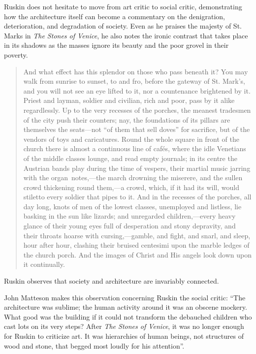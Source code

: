 Ruskin does not hesitate to move from art critic to social critic,
demonstrating how the architecture itself can become a commentary on
the denigration, deterioration, and degradation of society.  Even as he
praises the majesty of St. Mark{\textquotesingle}s in \textit{The
Stones of Venice}, he also notes the ironic contrast that takes place
in its shadows as the masses ignore its beauty and the poor grovel in
their poverty.  

\begin{quote}
And what effect has this splendor on those who pass beneath it?  You may
walk from sunrise to sunset, to and fro, before the gateway of St.
Mark’s, and you will not see an eye lifted to it, nor a countenance
brightened by it.  Priest and layman, soldier and civilian, rich and
poor, pass by it alike regardlessly.  Up to the very recesses of the
porches, the meanest tradesmen of the city push their counters; nay,
the foundations of its pillars are themselves the seats—not “of them
that sell doves” for sacrifice, but of the vendors of toys and
caricatures.  Round the whole square in front of the church there is
almost a continuous line of cafés, where the idle Venetians of the
middle classes lounge, and read empty journals; in its centre the
Austrian bands play during the time of vespers, their martial music
jarring with the organ~notes,—the march drowning the miserere, and the
sullen crowd thickening round them,—a crowd, which, if it had its will,
would stiletto every soldier that pipes to it.  And in the recesses of
the porches, all day long, knots of men of the lowest classes,
unemployed and listless, lie basking in the sun like lizards; and
unregarded children,—every heavy glance of their young eyes full of
desperation and stony depravity, and their throats hoarse with
cursing,—gamble, and fight, and snarl, and sleep, hour after hour,
clashing their bruised centesimi upon the marble ledges of the church
porch.  And the images of Christ and His angels look down upon it
continually. \citep[][vol. 2, ch. 4, sec. 15]{ruskin1885}
\end{quote}

Ruskin observes that society and architecture are invariably connected.

John Matteson makes this observation concerning Ruskin the social
critic: ``The architecture was sublime; the human activity
around it was an obscene mockery.  What good was the building if it
could not transform the debauched children who cast lots on its very
steps?  After \textit{The Stones of Venice}, it was no longer enough
for Ruskin to criticize art.  It was hierarchies of human beings, not
structures of wood and stone, that begged most loudly for his
attention''\citep[][pp.~302]{matteson2002}.

